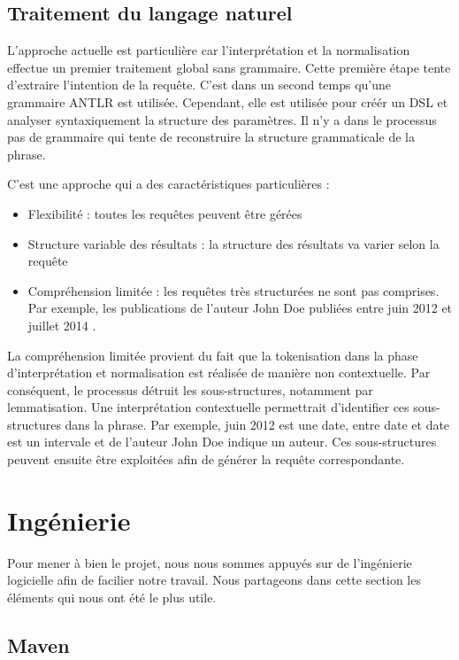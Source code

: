 \documentclass[a4paper]{elsarticle}
\begin{document}
\subsection{Traitement du langage naturel}

L'approche actuelle est particulière car l'interprétation et la normalisation effectue un premier traitement global sans grammaire. Cette première étape tente d'extraire l'intention de la requête. C'est dans un second temps qu'une grammaire ANTLR est utilisée. Cependant, elle est utilisée pour créér un DSL et analyser syntaxiquement la structure des paramètres. Il n'y a dans le processus pas de grammaire qui tente de reconstruire la structure grammaticale de la phrase.

C'est une approche qui a des caractéristiques particulières :
\begin{itemize}
\item Flexibilité : toutes les requêtes peuvent être gérées
\item Structure variable des résultats : la structure des résultats va varier selon la requête
\item Compréhension limitée : les requêtes très structurées ne sont pas comprises. Par exemple, \og les publications de l'auteur John Doe publiées entre juin 2012 et juillet 2014 \fg{}.
\end{itemize}

La compréhension limitée provient du fait que la tokenisation dans la phase d'interprétation et normalisation est réalisée de manière non contextuelle. Par conséquent, le processus détruit les sous-structures, notamment par lemmatisation. Une interprétation contextuelle permettrait d'identifier ces sous-structures dans la phrase. Par exemple, \og juin 2012 \fg{} est une date, \og entre date et date \fg{} est un intervale et  \og de l'auteur John Doe \fg{} indique un auteur. Ces sous-structures peuvent ensuite être exploitées afin de générer la requête correspondante.

\section{Ingénierie}

Pour mener à bien le projet, nous nous sommes appuyés sur de l'ingénierie logicielle afin de facilier notre travail. Nous partageons dans cette section les éléments qui nous ont été le plus utile.

\subsection{Maven}
\end{document}
